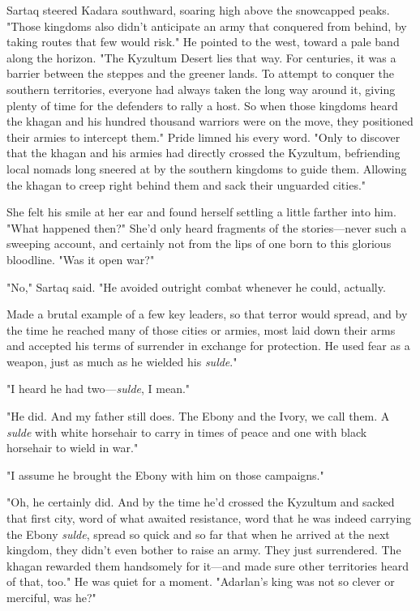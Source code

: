 Sartaq steered Kadara southward, soaring high above the snowcapped peaks.
"Those kingdoms also didn't anticipate an army that conquered from behind, by taking routes that few would risk."
He pointed to the west, toward a pale band along the horizon.
"The Kyzultum Desert lies that way.
For centuries, it was a barrier between the steppes and the greener lands.
To attempt to conquer the southern territories, everyone had always taken the long way around it, giving plenty of time for the defenders to rally a host.
So when those kingdoms heard the khagan and his hundred thousand warriors were on the move, they positioned their armies to intercept them."
Pride limned his every word.
"Only to discover that the khagan and his armies had directly crossed the Kyzultum, befriending local nomads long sneered at by the southern kingdoms to guide them.
Allowing the khagan to creep right behind them and sack their unguarded cities."

She felt his smile at her ear and found herself settling a little farther into him.
"What happened then?"
She'd only heard fragments of the stories---never such a sweeping account, and certainly not from the lips of one born to this glorious bloodline.
"Was it open war?"

"No," Sartaq said.
"He avoided outright combat whenever he could, actually.

Made a brutal example of a few key leaders, so that terror would spread, and by the time he reached many of those cities or armies, most laid down their arms and accepted his terms of surrender in exchange for protection.
He used fear as a weapon, just as much as he wielded his \emph{sulde}."

"I heard he had two---\emph{sulde}, I mean."

"He did.
And my father still does.
The Ebony and the Ivory, we call them.
A \emph{sulde} with white horsehair to carry in times of peace and one with black horsehair to wield in war."

"I assume he brought the Ebony with him on those campaigns."

"Oh, he certainly did.
And by the time he'd crossed the Kyzultum and sacked that first city, word of what awaited resistance, word that he was indeed carrying the Ebony \emph{sulde}, spread so quick and so far that when he arrived at the next kingdom, they didn't even bother to raise an army.
They just surrendered.
The khagan rewarded them handsomely for it---and made sure other territories heard of that, too."
He was quiet for a moment.
"Adarlan's king was not so clever or merciful, was he?"

